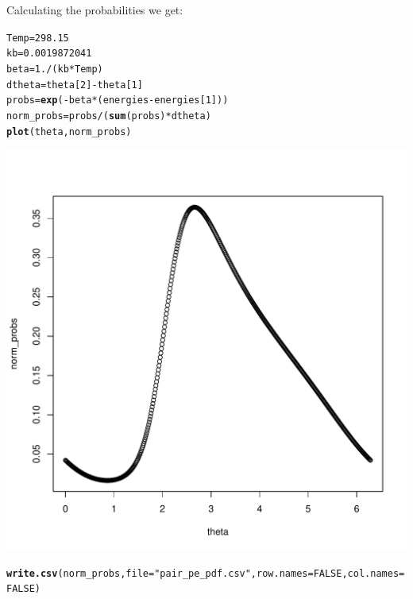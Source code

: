 \documentclass{article}\usepackage[]{graphicx}\usepackage[]{color}
\makeatletter
\def\maxwidth{ %
  \ifdim\Gin@nat@width>\linewidth
    \linewidth
  \else
    \Gin@nat@width
  \fi
}
\newcommand{\hlnum}[1]{\textcolor[rgb]{0.686,0.059,0.569}{#1}}%
\newcommand{\hlstr}[1]{\textcolor[rgb]{0.192,0.494,0.8}{#1}}%
\newcommand{\hlopt}[1]{\textcolor[rgb]{0,0,0}{#1}}%
\newcommand{\hlstd}[1]{\textcolor[rgb]{0.345,0.345,0.345}{#1}}%
\newcommand{\hlkwb}[1]{\textcolor[rgb]{0.69,0.353,0.396}{#1}}%
\newcommand{\hlkwc}[1]{\textcolor[rgb]{0.333,0.667,0.333}{#1}}%
\newcommand{\hlkwd}[1]{\textcolor[rgb]{0.737,0.353,0.396}{\textbf{#1}}}%
\newenvironment{kframe}{%
 \def\at@end@of@kframe{}%
 \ifinner\ifhmode%
  \def\at@end@of@kframe{\end{minipage}}%
  \begin{minipage}{\columnwidth}%
 \fi\fi%
 \def\FrameCommand##1{\hskip\@totalleftmargin \hskip-\fboxsep
 \colorbox{shadecolor}{##1}\hskip-\fboxsep
     \hskip-\linewidth \hskip-\@totalleftmargin \hskip\columnwidth}%
 \MakeFramed {\advance\hsize-\width
   \@totalleftmargin\z@ \linewidth\hsize
   \@setminipage}}%
 {\par\unskip\endMakeFramed%
 \at@end@of@kframe}
\newenvironment{knitrout}{}{} %
\makeatother
\begin{document}
Calculating the probabilities we get:

\begin{knitrout}
\color{fgcolor}\begin{kframe}
\begin{alltt}
  \hlstd{Temp} \hlkwb{=} \hlnum{298.15}
  \hlstd{kb} \hlkwb{=} \hlnum{0.0019872041}
  \hlstd{beta} \hlkwb{=} \hlnum{1.}\hlopt{/}\hlstd{(kb}\hlopt{*}\hlstd{Temp)}
  \hlstd{dtheta} \hlkwb{=} \hlstd{theta[}\hlnum{2}\hlstd{]}\hlopt{-}\hlstd{theta[}\hlnum{1}\hlstd{]}
  \hlstd{probs} \hlkwb{=} \hlkwd{exp}\hlstd{(}\hlopt{-}\hlstd{beta}\hlopt{*}\hlstd{(energies}\hlopt{-}\hlstd{energies[}\hlnum{1}\hlstd{]))}
  \hlstd{norm_probs} \hlkwb{=} \hlstd{probs}\hlopt{/}\hlstd{(}\hlkwd{sum}\hlstd{(probs)}\hlopt{*}\hlstd{dtheta)}
  \hlkwd{plot}\hlstd{(theta,norm_probs)}
\end{alltt}
\end{kframe}
\includegraphics[width=\maxwidth]{figure/probabilities-1} 
\begin{kframe}\begin{alltt}
  \hlkwd{write.csv}\hlstd{(norm_probs,}\hlkwc{file} \hlstd{=} \hlstr{"pair_pe_pdf.csv"}\hlstd{,}\hlkwc{row.names} \hlstd{=} \hlnum{FALSE}\hlstd{,}\hlkwc{col.names} \hlstd{=} \hlnum{FALSE}\hlstd{)}
\end{alltt}


{\ttfamily\noindent{}}\end{kframe}
\end{knitrout}
\end{document}
